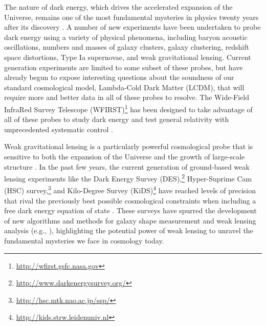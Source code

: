 \documentclass[usenatbib]{mnras}
\begin{document}
The nature of dark energy, which drives the accelerated expansion of the Universe, remains one of the most fundamental mysteries in physics twenty years after its discovery \citep{riess98,perlmutter99,detf,Frieman:2008sn,weinberg13}. 
A number of new experiments have been undertaken to probe dark energy using a variety of physical phenomena, including baryon acoustic oscillations, numbers and masses of galaxy clusters, galaxy clustering, redshift space distortions, Type Ia supernovae, and weak gravitational lensing. 
Current generation experiments are limited to some subset of these probes, but have already begun to expose interesting questions about the soundness of our standard cosmological model, Lambda-Cold Dark Matter (LCDM), that will require more and better data in all of these probes to resolve. 
The Wide-Field InfraRed Survey Telescope (WFIRST)\footnote{\url{http://wfirst.gsfc.nasa.gov}} has been designed to take advantage of all of these probes to study dark energy and test general relativity with unprecedented systematic control \citep{2015arXiv150303757S,2019arXiv190205569A,2019BAAS...51c.341D}.

Weak gravitational lensing is a particularly powerful cosmological probe that is sensitive to both the expansion of the Universe and the growth of large-scale structure \citep{2001PhR...340..291B,2017arXiv171003235M}. 
In the past few years, the current generation of ground-based weak lensing experiments like the Dark Energy Survey (DES),\footnote{\url{http://www.darkenergysurvey.org/}} Hyper-Suprime Cam (HSC) survey,\footnote{\url{http://hsc.mtk.nao.ac.jp/ssp/}} and Kilo-Degree Survey (KiDS)\footnote{\url{http://kids.strw.leidenuniv.nl}} have reached levels of precision that rival the previously best possible cosmological constraints when including a free dark energy equation of state \citep{2018arXiv181206076H,2018PhRvD..98d3528T,2019PhRvL.122q1301A,2019PASJ...71...43H}. 
These surveys have spurred the development of new algorithms and methods for galaxy shape measurement and weak lensing analysis (e.g., \citealt{HuffMandelbaum2017,SheldonHuff2017,shearcat}), highlighting the potential power of weak lensing to unravel the fundamental mysteries we face in cosmology today. 
\end{document}
